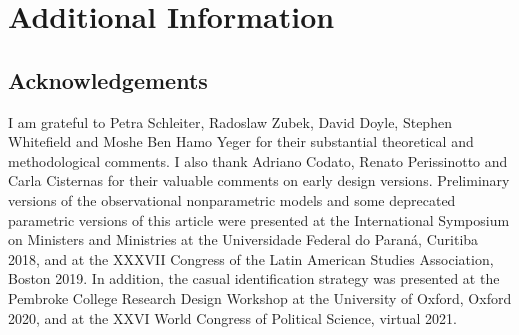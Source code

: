 \documentclass[12pt,halfline,a4paper]{ouparticle}
\begin{document}



\section*{Additional Information}

\subsection*{Acknowledgements}

I am grateful to Petra Schleiter, Radoslaw Zubek, David Doyle, Stephen Whitefield and Moshe Ben Hamo Yeger for their substantial theoretical and methodological comments. I also thank Adriano Codato, Renato Perissinotto and Carla Cisternas for their valuable comments on early design versions. Preliminary versions of the observational nonparametric models and some deprecated parametric versions of this article were presented at the International Symposium on Ministers and Ministries at the Universidade Federal do Paraná, Curitiba 2018, and at the XXXVII Congress of the Latin American Studies Association, Boston 2019. In addition, the casual identification strategy was presented at the Pembroke College Research Design Workshop at the University of Oxford, Oxford 2020, and at the XXVI World Congress of Political Science, virtual 2021.
\end{document}
